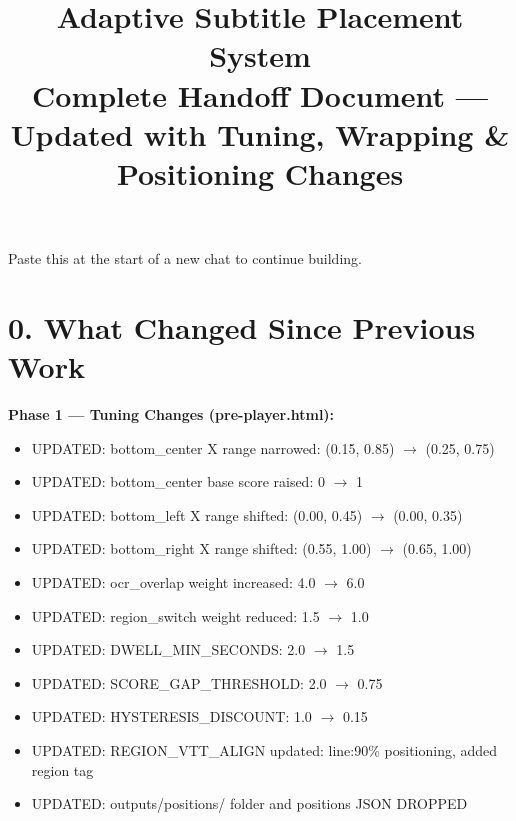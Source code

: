 \documentclass[11pt]{article}
\title{Adaptive Subtitle Placement System\\Complete Handoff Document --- Updated with Tuning, Wrapping \& Positioning Changes}
\author{}
\date{}
\begin{document}
\maketitle

\noindent Paste this at the start of a new chat to continue building.

\section*{0. What Changed Since Previous Work}

\textbf{Phase 1 --- Tuning Changes (pre-player.html):}
\begin{itemize}[leftmargin=1.2em]
    \item UPDATED: bottom\_center X range narrowed: (0.15, 0.85) $\rightarrow$ (0.25, 0.75)
    \item UPDATED: bottom\_center base score raised: 0 $\rightarrow$ 1
    \item UPDATED: bottom\_left X range shifted: (0.00, 0.45) $\rightarrow$ (0.00, 0.35)
    \item UPDATED: bottom\_right X range shifted: (0.55, 1.00) $\rightarrow$ (0.65, 1.00)
    \item UPDATED: ocr\_overlap weight increased: 4.0 $\rightarrow$ 6.0
    \item UPDATED: region\_switch weight reduced: 1.5 $\rightarrow$ 1.0
    \item UPDATED: DWELL\_MIN\_SECONDS: 2.0 $\rightarrow$ 1.5
    \item UPDATED: SCORE\_GAP\_THRESHOLD: 2.0 $\rightarrow$ 0.75
    \item UPDATED: HYSTERESIS\_DISCOUNT: 1.0 $\rightarrow$ 0.15
    \item UPDATED: REGION\_VTT\_ALIGN updated: line:90\% positioning, added region tag
    \item UPDATED: outputs/positions/ folder and positions JSON DROPPED
\end{itemize}
\end{document}
